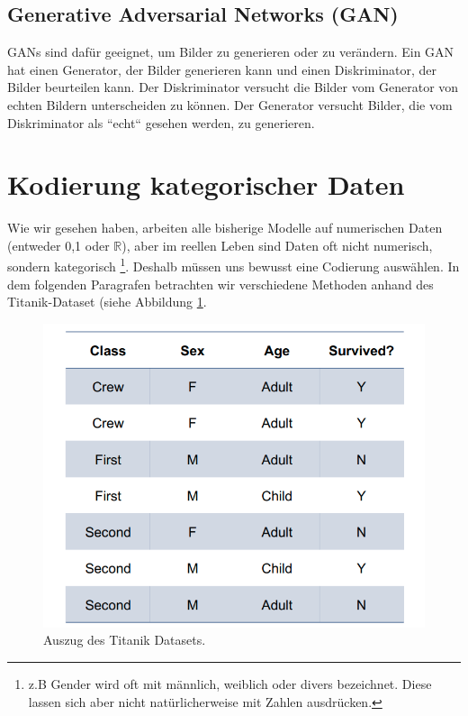 \subsection{Generative Adversarial Networks (GAN)}
GANs sind dafür geeignet, um Bilder zu generieren oder zu verändern. Ein GAN hat einen Generator, der Bilder generieren kann und einen Diskriminator, der Bilder beurteilen kann. Der Diskriminator versucht die Bilder vom Generator von echten Bildern unterscheiden zu können. Der Generator versucht Bilder, die vom Diskriminator als ``echt`` gesehen werden, zu generieren.

\section{Kodierung kategorischer Daten}
Wie wir gesehen haben, arbeiten alle bisherige Modelle auf numerischen Daten (entweder {0,1} oder $\mathbb{R}$), aber im reellen Leben sind Daten oft nicht numerisch, sondern kategorisch \footnote{z.B Gender wird oft mit männlich, weiblich oder divers bezeichnet. Diese lassen sich aber nicht natürlicherweise mit Zahlen ausdrücken. }. Deshalb müssen uns bewusst eine Codierung auswählen. In dem folgenden Paragrafen betrachten wir verschiedene Methoden anhand des Titanik-Dataset (siehe Abbildung \ref{fig:titanik-dataset}.

\begin{figure}
    \centering
    \includegraphics[scale=0.4]{Figures/Ml-Titanik-Dataset.png}
    \caption{Auszug des Titanik Datasets. }
    \label{fig:titanik-dataset}
\end{figure}
